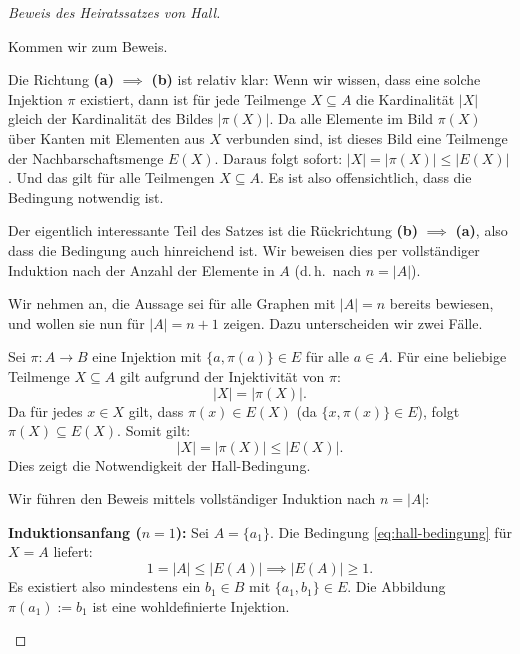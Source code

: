 \begin{proof}[Beweis des Heiratssatzes von Hall]

\begin{spoken-clean}[01:04:12 - 01:06:32]
Kommen wir zum Beweis. 

Die Richtung \textbf{(a)} $\implies$ \textbf{(b)} ist relativ klar: Wenn wir wissen, dass eine solche Injektion $\pi$ existiert, dann ist für jede Teilmenge $X \subseteq A$ die Kardinalität $|X|$ gleich der Kardinalität des Bildes $|\pi(X)|$. Da alle Elemente im Bild $\pi(X)$ über Kanten mit Elementen aus $X$ verbunden sind, ist dieses Bild eine Teilmenge der Nachbarschaftsmenge $E(X)$. Daraus folgt sofort: $|X| = |\pi(X)| \le |E(X)|$. Und das gilt für alle Teilmengen $X \subseteq A$. Es ist also offensichtlich, dass die Bedingung notwendig ist.

Der eigentlich interessante Teil des Satzes ist die Rückrichtung \textbf{(b)} $\implies$ \textbf{(a)}, also dass die Bedingung auch hinreichend ist. Wir beweisen dies per vollständiger Induktion nach der Anzahl der Elemente in $A$ (d.\,h.\ nach $n = |A|$). 

Wir nehmen an, die Aussage sei für alle Graphen mit $|A| = n$ bereits bewiesen, und wollen sie nun für $|A| = n+1$ zeigen. Dazu unterscheiden wir zwei Fälle.
\end{spoken-clean}

\begin{math-stroke}
\begin{short-proof}[Hinrichtung \texorpdfstring{$\mathbf{(a) \implies (b)}$}{(a) => (b)}]
Sei $\pi \colon A \to B$ eine Injektion mit $\{a, \pi(a)\} \in E$ für alle $a \in A$. Für eine beliebige Teilmenge $X \subseteq A$ gilt aufgrund der Injektivität von $\pi$:
\[
|X| = |\pi(X)|.
\]
Da für jedes $x \in X$ gilt, dass $\pi(x) \in E(X)$ (da $\{x, \pi(x)\} \in E$), folgt $\pi(X) \subseteq E(X)$. Somit gilt:
\[
|X| = |\pi(X)| \le |E(X)|.
\]
Dies zeigt die Notwendigkeit der Hall-Bedingung.
\end{short-proof}

\begin{short-proof}[Rückrichtung \texorpdfstring{$\mathbf{(b) \implies (a)}$}{(b) => (a)} --- Induktionsanfang]
Wir führen den Beweis mittels vollständiger Induktion nach $n = |A|$:
\par\vspace{1ex}\noindent
\textbf{Induktionsanfang ($n = 1$):} Sei $A = \{a_1\}$. Die Bedingung \eqref{eq:hall-bedingung} für $X = A$ liefert:
\[
1 = |A| \le |E(A)| \implies |E(A)| \ge 1.
\]
Es existiert also mindestens ein $b_1 \in B$ mit $\{a_1, b_1\} \in E$. Die Abbildung $\pi(a_1) := b_1$ ist eine wohldefinierte Injektion.
\end{short-proof}
\end{math-stroke}


\end{proof}
